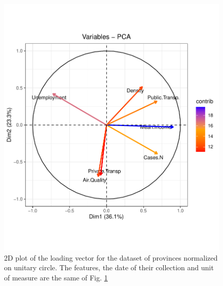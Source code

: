 \documentclass[
12pt, %
a4paper, %
oneside, %
headinclude,footinclude, %
BCOR5mm, %
]{scrartcl}
\begin{document}
\begin{figure}[h]
\begin{center}
\includegraphics[scale=1]{Pic/Province_FULL_Variables-PCA.pdf}
\caption{2D plot of the loading vector for the dataset of provinces normalized on unitary circle. The features, the date of their collection and unit of measure are the same of Fig. \ref{Province_FULL_Variables-PCA}}
\label{Province_FULL_Variables-PCA}
\end{center}
\end{figure}
\end{document}
